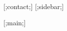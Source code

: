 \documentclass[letterpaper,10pt]{article}
\begin{document}
\pagestyle{empty}
\begin{center}\section*{ \fontsize{48}{16}\selectfont [;name;]}\end{center}
\begin{minipage}[t][0em][t]{0.2\textwidth}
  [;contact;]
  [;sidebar;]
\end{minipage}\hspace{0.5cm}
\begin{minipage}[t][0em][t]{0.8\textwidth}
  [;main;]
\end{minipage}\hspace{0.5cm}
\end{document}
